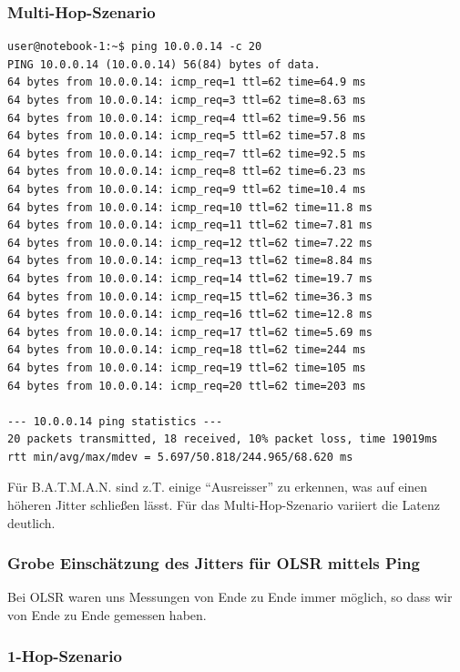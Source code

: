 \documentclass[a4paper,10pt]{article}
\begin{document}
\subsubsection*{Multi-Hop-Szenario}

\begin{lstlisting}
user@notebook-1:~$ ping 10.0.0.14 -c 20
PING 10.0.0.14 (10.0.0.14) 56(84) bytes of data.
64 bytes from 10.0.0.14: icmp_req=1 ttl=62 time=64.9 ms
64 bytes from 10.0.0.14: icmp_req=3 ttl=62 time=8.63 ms
64 bytes from 10.0.0.14: icmp_req=4 ttl=62 time=9.56 ms
64 bytes from 10.0.0.14: icmp_req=5 ttl=62 time=57.8 ms
64 bytes from 10.0.0.14: icmp_req=7 ttl=62 time=92.5 ms
64 bytes from 10.0.0.14: icmp_req=8 ttl=62 time=6.23 ms
64 bytes from 10.0.0.14: icmp_req=9 ttl=62 time=10.4 ms
64 bytes from 10.0.0.14: icmp_req=10 ttl=62 time=11.8 ms
64 bytes from 10.0.0.14: icmp_req=11 ttl=62 time=7.81 ms
64 bytes from 10.0.0.14: icmp_req=12 ttl=62 time=7.22 ms
64 bytes from 10.0.0.14: icmp_req=13 ttl=62 time=8.84 ms
64 bytes from 10.0.0.14: icmp_req=14 ttl=62 time=19.7 ms
64 bytes from 10.0.0.14: icmp_req=15 ttl=62 time=36.3 ms
64 bytes from 10.0.0.14: icmp_req=16 ttl=62 time=12.8 ms
64 bytes from 10.0.0.14: icmp_req=17 ttl=62 time=5.69 ms
64 bytes from 10.0.0.14: icmp_req=18 ttl=62 time=244 ms
64 bytes from 10.0.0.14: icmp_req=19 ttl=62 time=105 ms
64 bytes from 10.0.0.14: icmp_req=20 ttl=62 time=203 ms

--- 10.0.0.14 ping statistics --- 
20 packets transmitted, 18 received, 10% packet loss, time 19019ms
rtt min/avg/max/mdev = 5.697/50.818/244.965/68.620 ms
\end{lstlisting}

Für B.A.T.M.A.N. sind z.T. einige "`Ausreisser"' zu erkennen, was auf einen höheren Jitter schließen lässt.
Für das Multi-Hop-Szenario variiert die Latenz deutlich.

\subsubsection{Grobe Einschätzung des Jitters für OLSR mittels Ping}

Bei OLSR waren uns Messungen von Ende zu Ende immer möglich, so dass wir von Ende zu Ende gemessen haben.

\subsubsection*{1-Hop-Szenario}
\end{document}
